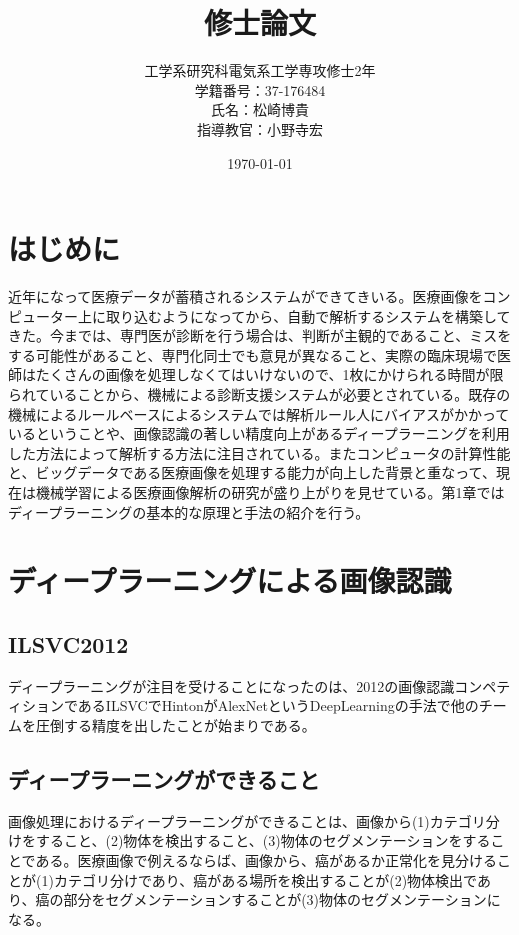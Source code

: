\documentclass[a4j,10pt,oneside,openany]{jsbook}
\title{{\Huge \textbf{修士論文}}}
\author{工学系研究科電気系工学専攻修士2年\\学籍番号：37-176484\\ 氏名：松崎博貴\\ 指導教官：小野寺宏}
\date{\today}
\begin{document}
%
%
\maketitle
\frontmatter
\tableofcontents
%
%
\mainmatter
\chapter{はじめに}
近年になって医療データが蓄積されるシステムができてきいる。医療画像をコンピューター上に取り込むようになってから、自動で解析するシステムを構築してきた。今までは、専門医が診断を行う場合は、判断が主観的であること、ミスをする可能性があること、専門化同士でも意見が異なること、実際の臨床現場で医師はたくさんの画像を処理しなくてはいけないので、1枚にかけられる時間が限られていることから、機械による診断支援システムが必要とされている。既存の機械によるルールベースによるシステムでは解析ルール人にバイアスがかかっているということや、画像認識の著しい精度向上があるディープラーニングを利用した方法によって解析する方法に注目されている。またコンピュータの計算性能と、ビッグデータである医療画像を処理する能力が向上した背景と重なって、現在は機械学習による医療画像解析の研究が盛り上がりを見せている。第1章ではディープラーニングの基本的な原理と手法の紹介を行う。

\chapter{ディープラーニングによる画像認識}
\section{ILSVC2012}
ディープラーニングが注目を受けることになったのは、2012の画像認識コンペティションであるILSVCでHintonがAlexNetというDeepLearningの手法で他のチームを圧倒する精度を出したことが始まりである。
\section{ディープラーニングができること}
画像処理におけるディープラーニングができることは、画像から(1)カテゴリ分けをすること、(2)物体を検出すること、(3)物体のセグメンテーションをすることである。医療画像で例えるならば、画像から、癌があるか正常化を見分けることが(1)カテゴリ分けであり、癌がある場所を検出することが(2)物体検出であり、癌の部分をセグメンテーションすることが(3)物体のセグメンテーションになる。
\end{document}
